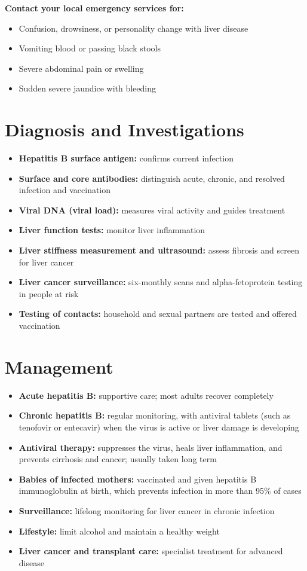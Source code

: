 \textbf{Contact your local emergency services for:}
\begin{itemize}
    \item Confusion, drowsiness, or personality change with liver disease
    \item Vomiting blood or passing black stools
    \item Severe abdominal pain or swelling
    \item Sudden severe jaundice with bleeding
\end{itemize}

\section*{Diagnosis and Investigations}
\begin{itemize}
    \item \textbf{Hepatitis B surface antigen:} confirms current infection
    \item \textbf{Surface and core antibodies:} distinguish acute, chronic, and resolved infection and vaccination
    \item \textbf{Viral DNA (viral load):} measures viral activity and guides treatment
    \item \textbf{Liver function tests:} monitor liver inflammation
    \item \textbf{Liver stiffness measurement and ultrasound:} assess fibrosis and screen for liver cancer
    \item \textbf{Liver cancer surveillance:} six-monthly scans and alpha-fetoprotein testing in people at risk
    \item \textbf{Testing of contacts:} household and sexual partners are tested and offered vaccination
\end{itemize}

\section*{Management}
\begin{itemize}
    \item \textbf{Acute hepatitis B:} supportive care; most adults recover completely
    \item \textbf{Chronic hepatitis B:} regular monitoring, with antiviral tablets (such as tenofovir or entecavir) when the virus is active or liver damage is developing
    \item \textbf{Antiviral therapy:} suppresses the virus, heals liver inflammation, and prevents cirrhosis and cancer; usually taken long term
    \item \textbf{Babies of infected mothers:} vaccinated and given hepatitis B immunoglobulin at birth, which prevents infection in more than 95\% of cases
    \item \textbf{Surveillance:} lifelong monitoring for liver cancer in chronic infection
    \item \textbf{Lifestyle:} limit alcohol and maintain a healthy weight
    \item \textbf{Liver cancer and transplant care:} specialist treatment for advanced disease
\end{itemize}


